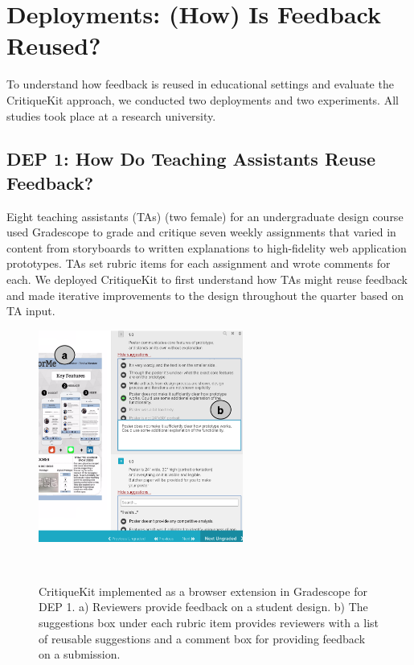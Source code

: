 \section{Deployments: (How) Is Feedback Reused?}
To understand how feedback is reused in educational settings and evaluate the CritiqueKit approach, we conducted two deployments and two experiments. All studies took place at a research university. 

\subsection{DEP 1: How Do Teaching Assistants Reuse Feedback?}
Eight teaching assistants (TAs) (two female) for an undergraduate design course used Gradescope to grade and critique seven weekly assignments that varied in content from storyboards to written explanations to high-fidelity web application prototypes. TAs set rubric items for each assignment and wrote comments for each. We deployed CritiqueKit to first understand how TAs might reuse feedback and made iterative improvements to the design throughout the quarter based on TA input.

\begin{figure}
\centering
  \includegraphics[width=0.6\textwidth]{critiquekit/figures/gradescope.png}
  \caption{CritiqueKit implemented as a browser extension in Gradescope for DEP 1. a) Reviewers provide feedback on a student design. b) The suggestions box under each rubric item provides reviewers with a list of reusable suggestions and a comment box for providing feedback on a submission.}~\label{fig:critiquekit_gradescope}
\end{figure}

